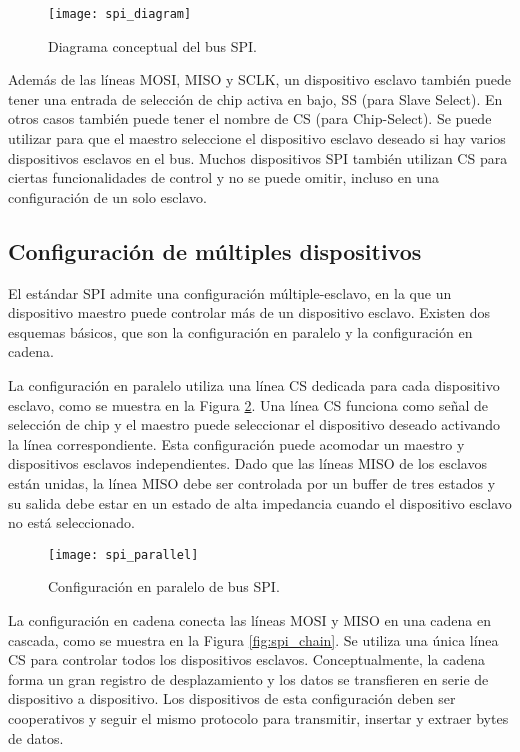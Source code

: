     \begin{figure}[hbtp]
        \centering
        \texttt{[image: spi\_diagram]}
        \caption{Diagrama conceptual del bus SPI.}
        \label{fig:spi_diagram}
    \end{figure}    

    Además de las líneas MOSI, MISO y SCLK, un dispositivo esclavo también puede tener una entrada de selección de chip activa en bajo, SS (para Slave Select). En otros casos también puede tener el nombre de  CS (para Chip-Select). Se puede utilizar para que el maestro seleccione el dispositivo esclavo deseado si hay varios dispositivos esclavos en el bus. Muchos dispositivos SPI también utilizan CS para ciertas funcionalidades de control y no se puede omitir, incluso en una configuración de un solo esclavo.

    \subsection{Configuración de múltiples dispositivos}

    El estándar SPI admite una configuración múltiple-esclavo, en la que un dispositivo maestro puede controlar más de un dispositivo esclavo. Existen dos esquemas básicos, que son la configuración en paralelo y la configuración en cadena.

    La configuración en paralelo utiliza una línea CS dedicada para cada dispositivo esclavo, como se muestra en la Figura \ref{fig:spi_parallel}. Una línea CS funciona como señal de selección de chip y el maestro puede seleccionar el dispositivo deseado activando la línea correspondiente. Esta configuración puede acomodar un maestro y dispositivos esclavos independientes. Dado que las líneas MISO de los esclavos están unidas, la línea MISO debe ser controlada por un buffer de tres estados y su salida debe estar en un estado de alta impedancia cuando el dispositivo esclavo no está seleccionado. 

    \begin{figure}[hbtp]
      \centering
      \texttt{[image: spi\_parallel]}
      \caption{Configuración en paralelo de bus SPI.}
      \label{fig:spi_parallel}
    \end{figure}    

    La configuración en cadena conecta las líneas MOSI y MISO en una cadena en cascada, como se muestra en la Figura \ref{fig:spi_chain}. Se utiliza una única línea CS para controlar todos los dispositivos esclavos. Conceptualmente, la cadena forma un gran registro de desplazamiento y los datos se transfieren en serie de dispositivo a dispositivo. Los dispositivos de esta configuración deben ser cooperativos y seguir el mismo protocolo para transmitir, insertar y extraer bytes de datos.

